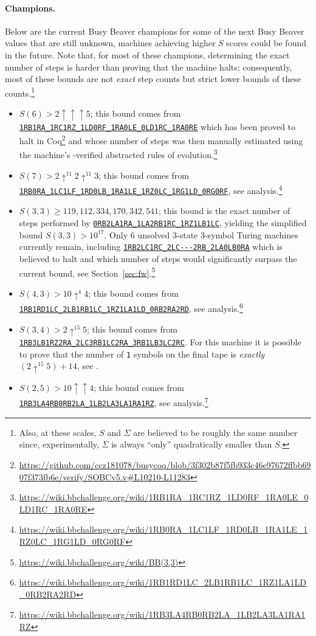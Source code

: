 \documentclass[a4paper,british]{article}
\theoremstyle{definition} %
\numberwithin{equation}{section}
\theoremstyle{definition} %
\newcommand{\tm}[1]{\href{https://bbchallenge.org/#1}{\texttt{\nolinkurl{#1}}}}
\newcommand{\sone}{\texttt{1}\xspace}
\begin{document}
\paragraph{Champions.} Below are the current Busy Beaver champions for some of the next Busy Beaver values that are still unknown, \ie machines achieving higher $S$ scores could be found in the future. Note that, for most of these champions, determining the exact number of steps is harder than proving that the machine halts; consequently, most of these bounds are not \textit{exact} step counts but strict lower bounds of these counts.\footnote{Also, at these scales, $S$ and $\Sigma$ are believed to be roughly the same number since, experimentally, $\Sigma$ is always ``only'' quadratically smaller than $S$.}
\begin{itemize}
    \item $S(6) > 2 \uparrow \uparrow \uparrow 5$; this bound comes from \tm{1RB1RA_1RC1RZ_1LD0RF_1RA0LE_0LD1RC_1RA0RE} which has been proved to halt in Coq\footnote{\url{https://github.com/ccz181078/busycoq/blob/3f302b87f5fb933c46e97672ffbb6907f373fb6e/verify/SOBCv5.v\#L10210-L11283}} and whose number of steps was then manually estimated using the machine's \Coq-verified abstracted rules of evolution.\footnote{\url{https://wiki.bbchallenge.org/wiki/1RB1RA_1RC1RZ_1LD0RF_1RA0LE_0LD1RC_1RA0RE}}
    \item $S(7) > 2 \uparrow^{11} 2 \uparrow^{11} 3$; this bound comes from \tm{1RB0RA_1LC1LF_1RD0LB_1RA1LE_1RZ0LC_1RG1LD_0RG0RF}, see analysis.\footnote{\url{https://wiki.bbchallenge.org/wiki/1RB0RA_1LC1LF_1RD0LB_1RA1LE_1RZ0LC_1RG1LD_0RG0RF}}
    \item $S(3,3) \geq 119{,}112{,}334{,}170{,}342{,}541$; this bound is the exact number of steps performed by \tm{0RB2LA1RA_1LA2RB1RC_1RZ1LB1LC}, yielding the simplified bound $S(3,3) > 10^{17}$. Only 6 unsolved 3-state 3-symbol Turing machines currently remain, including \tm{1RB2LC1RC_2LC---2RB_2LA0LB0RA} which is believed to halt and which number of steps would significantly surpass the current bound, see Section~\ref{sec:fw}.\footnote{\url{https://wiki.bbchallenge.org/wiki/BB(3,3)}}
    \item $S(4,3) > 10 \uparrow^4 4$; this bound comes from \tm{1RB1RD1LC_2LB1RB1LC_1RZ1LA1LD_0RB2RA2RD}, see analysis.\footnote{\url{https://wiki.bbchallenge.org/wiki/1RB1RD1LC_2LB1RB1LC_1RZ1LA1LD_0RB2RA2RD}}
    \item $S(3,4) > 2 \uparrow^{15} 5$; this bound comes from \tm{1RB3LB1RZ2RA_2LC3RB1LC2RA_3RB1LB3LC2RC}. For this machine it is possible to prove that the number of \sone symbols on the final tape is \textit{exactly} $(2 \uparrow^{15} 5) + 14$, see \cite{ligocki2024bb34ack14}.
    \item $S(2,5) > 10 \uparrow \uparrow 4$; this bound comes from \tm{1RB3LA4RB0RB2LA_1LB2LA3LA1RA1RZ}, see analysis.\footnote{\url{https://wiki.bbchallenge.org/wiki/1RB3LA4RB0RB2LA_1LB2LA3LA1RA1RZ}}
\end{itemize}
\end{document}
